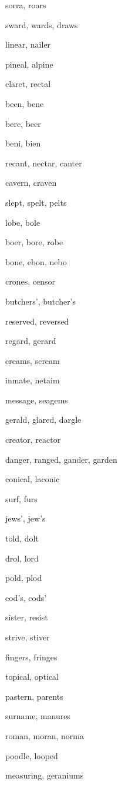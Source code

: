     \item sorra, roars
    \item sward, wards, draws
    \item linear, nailer
    \item pineal, alpine
    \item claret, rectal
    \item been, bene
    \item bere, beer
    \item beni, bien
    \item recant, nectar, canter
    \item cavern, craven
    \item slept, spelt, pelts
    \item lobe, bole
    \item boer, bore, robe
    \item bone, ebon, nebo
    \item crones, censor
    \item butchers', butcher's
    \item reserved, reversed
    \item regard, gerard
    \item creams, scream
    \item inmate, netaim
    \item message, seagems
    \item gerald, glared, dargle
    \item creator, reactor
    \item danger, ranged, gander, garden
    \item conical, laconic
    \item surf, furs
    \item jews', jew's
    \item told, dolt
    \item drol, lord
    \item pold, plod
    \item cod's, cods'
    \item sister, resist
    \item strive, stiver
    \item fingers, fringes
    \item topical, optical
    \item pastern, parents
    \item surname, manures
    \item roman, moran, norma
    \item poodle, looped
    \item measuring, geraniums
